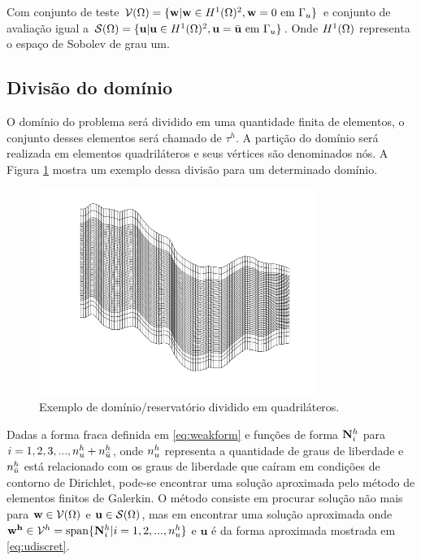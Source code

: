 Com conjunto de teste $\mathcal{V}(\Omega) = \{ \mathbf{w} | \mathbf{w} \in H^1(\Omega) ^2 , \mathbf{w} = 0 \text{ em } \Gamma_u \}$ e conjunto de avaliação igual a $\mathcal{S}(\Omega) = \{ \mathbf{u} | \mathbf{u} \in H^1(\Omega) ^2 , \mathbf{u} = \bar{\mathbf{u}} \text{ em } \Gamma_u \}$. Onde $H^1(\Omega)$ representa o espaço de Sobolev de grau um.

\subsection{Divisão do domínio}

O domínio do problema será dividido em uma quantidade finita de elementos, o conjunto desses elementos será chamado de $\tau^h$.  A partição do domínio será realizada em elementos quadriláteros e seus vértices são denominados nós. A Figura \ref{fig:elemento} mostra um exemplo dessa divisão para um determinado domínio.

\begin{figure}[!htbp]
\centering
\includegraphics[width=0.8\textwidth]{chap01/figs/exemplo_dominio.png}
\caption{Exemplo de domínio/reservatório dividido em quadriláteros.}
\label{fig:elemento}
\end{figure}


Dadas a forma fraca definida em \eqref{eq:weakform} e funções de forma ${\mathbf{N}_{i}^h}$ para $i = 1, 2, 3, ..., n_u^h + n_{\bar{u}}^h$, onde $n_u^h$ representa a quantidade de graus de liberdade e $n_{\bar{u}}^h$ está relacionado com os graus de liberdade que caíram em condições de contorno de Dirichlet, pode-se encontrar uma solução aproximada pelo método de elementos finitos de Galerkin.  O método consiste em procurar solução não mais para $\mathbf{w} \in \mathcal{V}(\Omega)$ e $\mathbf{u} \in \mathcal{S}(\Omega)$, mas em encontrar uma solução aproximada onde  $\mathbf{w^h} \in \mathcal{V}^h = \text{span}\{ {\mathbf{N}_{i}^h} | i = 1,2, ..., n_u^h  \}$ e $\mathbf{u}$ é  da forma aproximada mostrada em \eqref{eq:udiscret}. 

